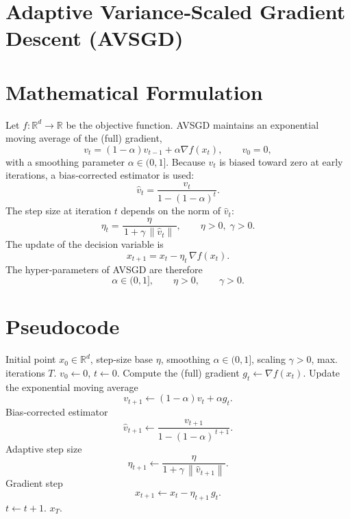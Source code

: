\documentclass{article}
\newcommand{\norm}[1]{\left\lVert #1 \right\rVert}
\begin{document}
\section*{Adaptive Variance‑Scaled Gradient Descent (AVSGD)}

\section*{Mathematical Formulation}
Let $f:\mathbb{R}^{d}\rightarrow\mathbb{R}$ be the objective function.  
AVSGD maintains an exponential moving average of the (full) gradient,
\begin{equation}
    v_{t}= (1-\alpha)v_{t-1}+ \alpha \nabla f(x_{t}),\qquad v_{0}=0,
    \label{eq:vt}
\end{equation}
with a smoothing parameter $\alpha\in(0,1]$.  
Because $v_{t}$ is biased toward zero at early iterations, a bias‑corrected estimator is used:
\begin{equation}
    \hat v_{t}= \frac{v_{t}}{1-(1-\alpha)^{t}} .
    \label{eq:vtbias}
\end{equation}
The step size at iteration $t$ depends on the norm of $\hat v_{t}$:
\begin{equation}
    \eta_{t}= \frac{\eta}{\,1+\gamma \,\norm{\hat v_{t}}\,},
    \qquad \eta>0,\;\gamma>0 .
    \label{eq:et}
\end{equation}
The update of the decision variable is
\begin{equation}
    x_{t+1}= x_{t}-\eta_{t}\,\nabla f(x_{t}) .
    \label{eq:update}
\end{equation}
The hyper‑parameters of AVSGD are therefore
\[
\alpha\in(0,1],\qquad \eta>0,\qquad \gamma>0 .
\]

\section*{Pseudocode}
\begin{algorithm}[H]
\caption{Adaptive Variance‑Scaled Gradient Descent (AVSGD)}
\label{alg:avsgd}
\begin{algorithmic}[1]
\REQUIRE Initial point $x_{0}\in\mathbb{R}^{d}$, step‑size base $\eta$, smoothing $\alpha\in(0,1]$, scaling $\gamma>0$, max. iterations $T$.
\STATE $v_{0}\leftarrow 0$, $t\leftarrow 0$.
    \STATE Compute the (full) gradient $g_{t}\leftarrow \nabla f(x_{t})$.
    \STATE Update the exponential moving average
    \[
        v_{t+1}\leftarrow (1-\alpha)v_{t}+ \alpha g_{t}.
    \]
    \STATE Bias‑corrected estimator
    \[
        \hat v_{t+1}\leftarrow \frac{v_{t+1}}{1-(1-\alpha)^{\,t+1}} .
    \]
    \STATE Adaptive step size
    \[
        \eta_{t+1}\leftarrow \frac{\eta}{1+\gamma \,\norm{\hat v_{t+1}} } .
    \]
    \STATE Gradient step
    \[
        x_{t+1}\leftarrow x_{t}-\eta_{t+1}\,g_{t}.
    \]
    \STATE $t\leftarrow t+1$.
\ENDWHILE
\RETURN $x_{T}$.
\end{algorithmic}
\end{algorithm}
\end{document}
